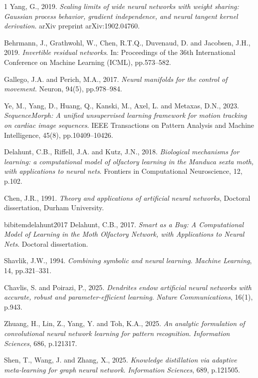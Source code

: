 \documentclass{article}
\begin{document}
\begin{thebibliography}{1}
Yang, G., 2019. \textit{Scaling limits of wide neural networks with weight sharing: Gaussian process behavior, gradient independence, and neural tangent kernel derivation}. arXiv preprint arXiv:1902.04760.

Behrmann, J., Grathwohl, W., Chen, R.T.Q., Duvenaud, D. and Jacobsen, J.H., 2019. \textit{Invertible residual networks}. In: Proceedings of the 36th International Conference on Machine Learning (ICML), pp.573--582.

Gallego, J.A. and Perich, M.A., 2017. \textit{Neural manifolds for the control of movement}. Neuron, 94(5), pp.978--984.

Ye, M., Yang, D., Huang, Q., Kanski, M., Axel, L. and Metaxas, D.N., 2023. \textit{SequenceMorph: A unified unsupervised learning framework for motion tracking on cardiac image sequences}. IEEE Transactions on Pattern Analysis and Machine Intelligence, 45(8), pp.10409--10426.

Delahunt, C.B., Riffell, J.A. and Kutz, J.N., 2018. \textit{Biological mechanisms for learning: a computational model of olfactory learning in the Manduca sexta moth, with applications to neural nets}. Frontiers in Computational Neuroscience, 12, p.102.


Chen, J.R., 1991. \textit{Theory and applications of artificial neural networks}, Doctoral dissertation, Durham University.

bibitem{delahunt2017}
Delahunt, C.B., 2017. \textit{Smart as a Bug: A Computational Model of Learning in the Moth Olfactory Network, with Applications to Neural Nets}. Doctoral dissertation.

Shavlik, J.W., 1994. \textit{Combining symbolic and neural learning}. \textit{Machine Learning}, 14, pp.321--331.

Chavlis, S. and Poirazi, P., 2025. \textit{Dendrites endow artificial neural networks with accurate, robust and parameter-efficient learning}. \textit{Nature Communications}, 16(1), p.943.

Zhuang, H., Lin, Z., Yang, Y. and Toh, K.A., 2025. \textit{An analytic formulation of convolutional neural network learning for pattern recognition}. \textit{Information Sciences}, 686, p.121317.



Shen, T., Wang, J. and Zhang, X., 2025. \textit{Knowledge distillation via adaptive meta-learning for graph neural network}. \textit{Information Sciences}, 689, p.121505.



\end{thebibliography}
\end{document}
